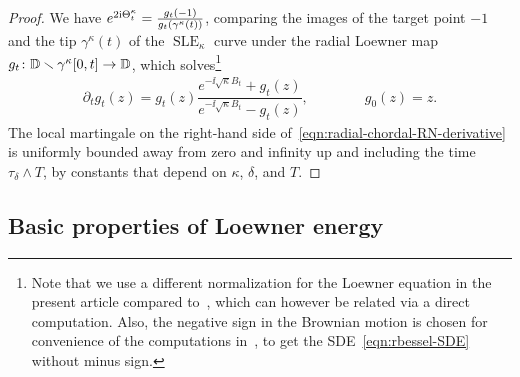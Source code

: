 \documentclass[a4paper, 11pt]{article}
\theoremstyle{definition}
\numberwithin{equation}{section}
\numberwithin{figure}{section}
\newcommand{\SLE}[1][]{\operatorname{SLE}_{#1}}
\newcommand{\rbessel}[1][]{{\ifx&#1&\else{_{#1}}\fi}\Theta^{\kappa}}
\begin{document}
\begin{proof}
We have $e^{2\ii\rbessel_t} = \frac{g_t(-1)}{g_t(\gamma^{\kappa}(t))}$,
comparing the images of the target point $-1$ and the tip $\gamma^{\kappa}(t)$ of the $\SLE[\kappa]$ curve under 
the radial Loewner map $g_t \colon \mathbb{D} \smallsetminus \gamma^{\kappa}[0,t] \to \mathbb{D}$, 
which solves\footnote{Note that we use a different normalization for the Loewner equation in the present article compared to~\cite{Lawler:Continuity_of_radial_and_two-sided_radial_SLE_at_the_terminal_point}, 
which can however be related via a direct computation. 
Also, the negative sign in the Brownian motion is chosen for convenience of the computations in~\cite{Lawler:Continuity_of_radial_and_two-sided_radial_SLE_at_the_terminal_point}, 
to get the SDE~\eqref{eqn:rbessel-SDE} without minus sign.}
\begin{align*}
\partial_t g_t(z) = 
g_t(z)\dfrac{e^{- \ii \sqrt{\kappa} B_t}+g_t(z)}{e^{ - \ii \sqrt{\kappa} B_t}-g_t(z)} ,
\qquad\qquad g_0(z) = z.
\end{align*}
The local martingale on the right-hand side of~\eqref{eqn:radial-chordal-RN-derivative} 
is uniformly bounded away from zero and infinity 
up and including the time $\tau_\delta \wedge T$, by constants that depend on $\kappa$, $\delta$, and $T$.
\end{proof}

\subsection{Basic properties of Loewner energy}
\end{document}
